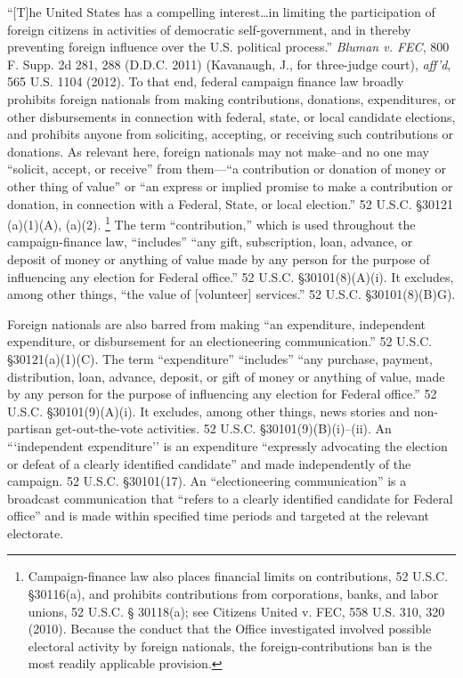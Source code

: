 ``[T]he United States has a compelling interest\dots in limiting the participation of foreign citizens in activities of democratic self-government, and in thereby preventing foreign influence over the U.S. political process.''
\textit{Bluman v. FEC}, 800 F. Supp. 2d 281, 288 (D.D.C. 2011) (Kavanaugh, J., for three-judge court), \textit{aff'd}, 565 U.S. 1104 (2012).
To that end, federal campaign finance law broadly prohibits foreign nationals from making contributions, donations, expenditures, or other disbursements in connection with federal, state, or local candidate elections, and prohibits anyone from soliciting, accepting, or receiving such contributions or donations.
As relevant here, foreign nationals may not make--and no one may ``solicit, accept, or receive'' from them---``a contribution or donation of money or other thing of value'' or ``an express or implied promise to make a contribution or donation, in connection with a Federal, State, or local election.''
52 U.S.C. \S 30121 (a)(1)(A), (a)(2).%
\footnote{Campaign-finance law also places financial limits on contributions, 52 U.S.C. \S 30116(a), and prohibits contributions from corporations, banks, and labor unions, 52 U.S.C. § 30118(a);
see Citizens United v. FEC, 558 U.S. 310, 320 (2010).
Because the conduct that the Office investigated involved possible electoral activity by foreign nationals, the foreign-contributions ban is the most readily applicable provision.}
The term ``contribution,'' which is used throughout the campaign-finance law, ``includes'' ``any gift, subscription, loan, advance, or deposit of money or anything of value made by any person for the purpose of influencing any election for Federal office.''
52 U.S.C. \S 30101(8)(A)(i).
It excludes, among other things, ``the value of [volunteer] services.'' 52 U.S.C. \S 30101(8)(B)G).

Foreign nationals are also barred from making ``an expenditure, independent expenditure, or disbursement for an electioneering communication.''
52 U.S.C. \S 30121(a)(1)(C).
The term ``expenditure'' ``includes'' ``any purchase, payment, distribution, loan, advance, deposit, or gift of money or anything of value, made by any person for the purpose of influencing any election for Federal office.''
52 U.S.C. \S 30101(9)(A)(i).
It excludes, among other things, news stories and non-partisan get-out-the-vote activities.
52 U.S.C. \S 30101(9)(B)(i)--(ii).
An ```independent expenditure'' is an expenditure ``expressly advocating the election or defeat of a clearly identified candidate'' and made independently of the campaign.
52 U.S.C. \S 30101(17).
An ``electioneering communication'' is a broadcast communication that ``refers to a clearly identified candidate for Federal office'' and is made within specified time periods and targeted at the relevant electorate.

